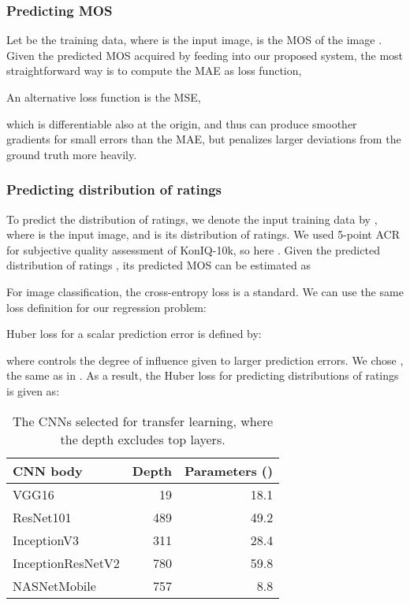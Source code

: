 \documentclass[10pt,journal,compsoc]{IEEEtran}
\begin{document}
\subsubsection{Predicting MOS}
Let  be the training data, where  is the input image,  is the MOS of the image . 
Given the predicted MOS  acquired by feeding  into our proposed system, the most straightforward way is to compute the MAE as loss function,

An alternative loss function is the MSE, 

which is differentiable also at the origin, and thus can produce smoother gradients for small errors than the MAE, but penalizes larger deviations from the ground truth more heavily. 




\subsubsection{Predicting distribution of ratings}

To predict the distribution of ratings, we denote the input training data by , where  is the input image, and  is its distribution of ratings. We used 5-point ACR for subjective quality assessment of KonIQ-10k, so here .
Given the predicted distribution of ratings   , its predicted MOS can be estimated as



For image classification, the cross-entropy loss is a standard. We can use the same loss definition for our regression problem:


\noindent Huber loss for a scalar prediction error  is defined by:

where  controls the degree of influence given to larger prediction errors. We chose , the same as in \cite{varga2018deeprn}. As a result, the Huber loss for predicting distributions of ratings is given as:







\begin{table}[tbp]
\setlength\extrarowheight{2pt}
\centering
\begin{tabular}{l r r } \hline
CNN body & Depth & Parameters () \\ \hline
VGG16 \cite{vgg}& 19 & 18.1 \\
ResNet101 \cite{he2016deep}& 489& 49.2\\
InceptionV3 \cite{szegedy2016rethinking}& 311& 28.4\\
InceptionResNetV2 \cite{szegedy2017inception} & 780 & 59.8\\
NASNetMobile \cite{zoph2017learning}& 757& 8.8 \\ \hline
\end{tabular} 
\caption{The CNNs selected for transfer learning, where the depth excludes top layers.}\label{tb:cnn} 
\vspace{-10pt}
\end{table}
\end{document}
